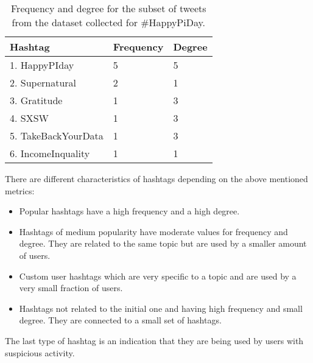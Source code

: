 \documentclass[journal, a4paper, 12pt]{article}
\begin{document}
      \begin{table}[!hbt]
            \begin{center}
            \caption{Frequency and degree for the subset of tweets from the dataset collected for \#HappyPiDay.}
            \label{tab:graph_freq_degree}
            \begin{tabular}{|p{4cm}|p{2cm}|p{2cm}|}
                  \hline
                  Hashtag & Frequency & Degree \\
            \hline
                  1. HappyPIday & 5 & 5 \\
                  \hline
                  2. Supernatural & 2  &  1  \\
                  \hline
                  3. Gratitude & 1 & 3 \\
            \hline
            4. SXSW & 1 & 3 \\
                  \hline
            5. TakeBackYourData & 1 & 3\\
                  \hline
            6. IncomeInquality & 1 & 1 \\
                  \hline
            \end{tabular}
            \end{center}
      \end{table}

There are different characteristics of hashtags depending on the above mentioned metrics:

\begin{itemize}

\item Popular hashtags have a high frequency and a high degree.

\item Hashtags of medium popularity have moderate values for frequency and degree. They are related to the same topic but are used by a smaller amount of users.

\item Custom user hashtags which are very specific to a topic and are used by a very small fraction of users.

\item Hashtags not related to the initial one and having high frequency and small degree. They are connected to a small set of hashtags.
\end{itemize}

The last type of hashtag is an indication that they are being used by users with suspicious activity. \\
\end{document}
